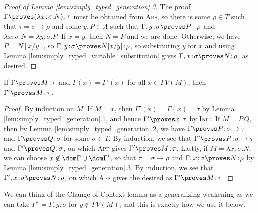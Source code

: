 \documentclass[reqno]{amsart}
\begin{document}
    \begin{proof}[Proof of Lemma \ref{lem:simply_typed_generation}.3]
        The proof $\Gamma\proves(\lambda x\!:\!\sigma.N)\!:\!\tau$ must be obtained from \textsc{Abs}, so there is some $\rho\in T$ such that $\tau=\sigma\rightarrow\rho$ and some $y,P\in\Lambda$ such that $\Gamma,y\!:\!\sigma\proves P:\rho$ and $\lambda x\!:\!\sigma.N=\lambda y\!:\!\sigma.P$. If $x=y$, then $N=P$ and we are done. Otherwise, we have $P=N[x/y]$, so $\Gamma,y\!:\!\sigma\proves N[x/y]\!:\!\rho$, so substituting $y$ for $x$ and using Lemma \ref{lem:simply_typed_variable_substitution} gives $\Gamma,x\!:\!\sigma\proves N\!:\!\rho$, as desired.
    \end{proof}

    \begin{lemma}\label{lem:simply_typed_change_of_context}
        If $\Gamma\proves M\!:\!\tau$ and $\Gamma(x)=\Gamma'(x)$ for all $x\in FV(M)$, then $\Gamma'\proves M\!:\!\tau$.
    \end{lemma}
    \begin{proof}
        By induction on $M$. If $M=x$, then $\Gamma'(x)=\Gamma(x)=\tau$ by Lemma \ref{lem:simply_typed_generation}.1, and hence $\Gamma'\proves x\!:\!\tau$ by \textsc{Init}. If $M=P\,Q$, then by Lemma \ref{lem:simply_typed_generation}.2, we have $\Gamma\proves P\!:\!\sigma\rightarrow\tau$ and $\Gamma\proves Q\!:\!\sigma$ for some $\sigma\in T$. By induction, we see that $\Gamma'\proves P\!:\!\sigma\to\tau$ and $\Gamma'\proves Q\!:\!\sigma$, on which \textsc{App} gives $\Gamma'\proves M\!:\!\tau$. Lastly, if $M=\lambda x\!:\!\sigma.N$, we can choose $x\not\in\dom\Gamma\cup\dom\Gamma'$, so that $\tau=\sigma\rightarrow\rho$ and $\Gamma,x\!:\!\sigma\proves N\!:\!\rho$ by Lemma \ref{lem:simply_typed_generation}.3. By induction, we see that $\Gamma',x\!:\!\sigma\proves N\!:\!\rho$, on which \textsc{Abs} gives the desired as $\Gamma'\proves M\!:\!\tau$.
    \end{proof}

    We can think of the Change of Context lemma as a generalizing weakening as we can take $\Gamma'\coloneqq\Gamma,y\!:\!\sigma$ for $y\not\in FV(M)$, and this is exactly how we use it below.
\end{document}
